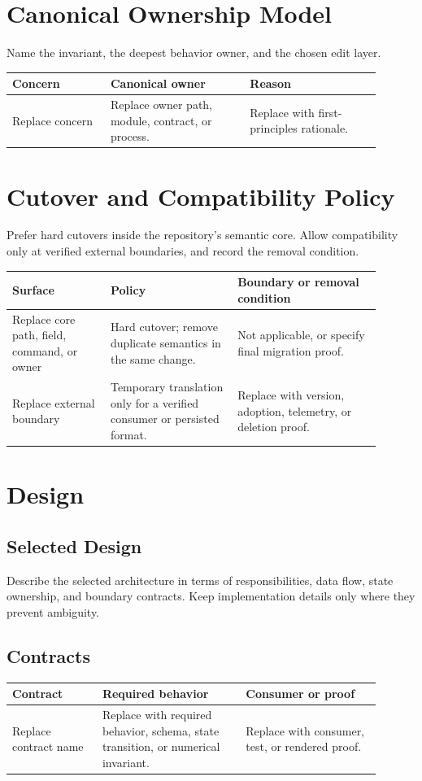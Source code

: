 \documentclass[11pt]{article}
\begin{document}
\section{Canonical Ownership Model}
Name the invariant, the deepest behavior owner, and the chosen edit layer.

\begin{longtable}{L{0.24\linewidth}L{0.34\linewidth}L{0.32\linewidth}}
\toprule
\textbf{Concern} & \textbf{Canonical owner} & \textbf{Reason} \\
\midrule
\endhead
Replace concern & Replace owner path, module, contract, or process. & Replace with first-principles rationale. \\
\bottomrule
\end{longtable}

\section{Cutover and Compatibility Policy}
Prefer hard cutovers inside the repository's semantic core. Allow compatibility only at verified external boundaries, and record the removal condition.

\begin{longtable}{L{0.24\linewidth}L{0.31\linewidth}L{0.35\linewidth}}
\toprule
\textbf{Surface} & \textbf{Policy} & \textbf{Boundary or removal condition} \\
\midrule
\endhead
Replace core path, field, command, or owner & Hard cutover; remove duplicate semantics in the same change. & Not applicable, or specify final migration proof. \\
Replace external boundary & Temporary translation only for a verified consumer or persisted format. & Replace with version, adoption, telemetry, or deletion proof. \\
\bottomrule
\end{longtable}

\section{Design}
\subsection{Selected Design}
Describe the selected architecture in terms of responsibilities, data flow, state ownership, and boundary contracts. Keep implementation details only where they prevent ambiguity.

\subsection{Contracts}
\begin{longtable}{L{0.22\linewidth}L{0.35\linewidth}L{0.33\linewidth}}
\toprule
\textbf{Contract} & \textbf{Required behavior} & \textbf{Consumer or proof} \\
\midrule
\endhead
Replace contract name & Replace with required behavior, schema, state transition, or numerical invariant. & Replace with consumer, test, or rendered proof. \\
\bottomrule
\end{longtable}
\end{document}
